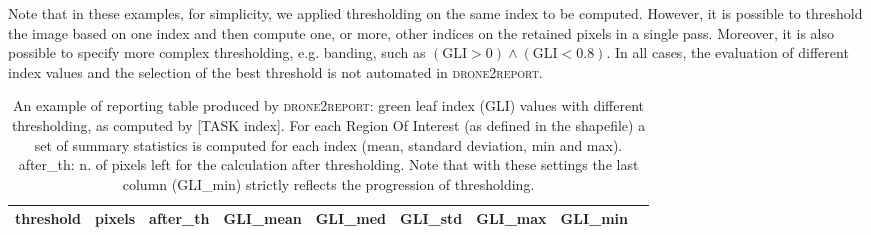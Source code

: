 \documentclass[drones,technicalnote,accept,pdftex,moreauthors]{Definitions/mdpi}
\begin{document}
Note that in these examples, for simplicity, we applied thresholding on the same index to be computed. However, it is possible to threshold the image based on one index and then compute one, or more, other indices on the retained pixels in a single pass. Moreover, it is also possible to specify more complex thresholding, e.g. banding, such as $(\text{GLI} > 0) \wedge (\text{GLI} < 0.8)$. In all cases, the evaluation of different index values and the selection of the best threshold is not automated in \textsc{drone2report}.

\begin{table}[H]
\small
\caption{An example of reporting table produced by \textsc{drone2report}: green leaf index (GLI) values with different thresholding, as computed by [TASK index]. For each Region Of Interest (as defined in the shapefile) a set of summary statistics is computed for each index (mean, standard deviation, min and max). after\_th: n. of pixels left for the calculation after thresholding. Note that with these settings the last column (GLI\_min) strictly reflects the progression of thresholding.}
\label{tab:index-thresholds}
\begin{tabular}{lllllllll}

\hline
\textbf{threshold}    & \textbf{pixels} & \textbf{after\_th} & \textbf{GLI\_mean} & \textbf{GLI\_med} & \textbf{GLI\_std} & \textbf{GLI\_max} & \textbf{GLI\_min} \\
\hline


\end{tabular}
\end{table}
\end{document}

